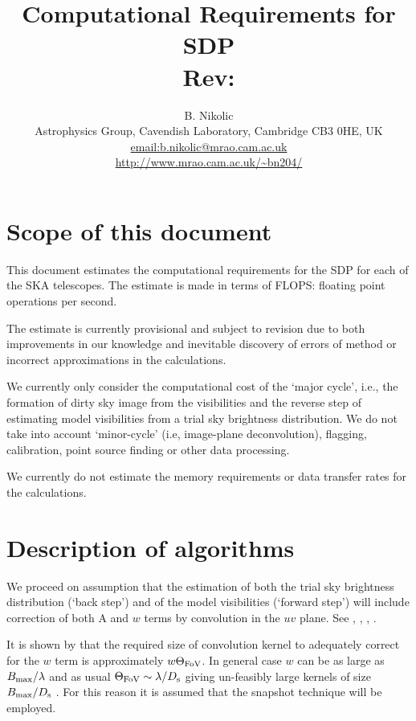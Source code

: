 \documentclass[useAMS,usenatbib,referee]{article}
\title{Computational Requirements for SDP\\
  Rev: }
\author{B. Nikolic\\
  Astrophysics Group, Cavendish Laboratory, Cambridge CB3 0HE, UK
  \\\url{email:b.nikolic@mrao.cam.ac.uk}
 \\\url{http://www.mrao.cam.ac.uk/~bn204/}}
\begin{document}
\maketitle

\tableofcontents

\section{Scope of this document}

This document estimates the computational requirements for the SDP for
each of the SKA telescopes. The estimate is made in terms of FLOPS:
floating point operations per second.

The estimate is currently provisional and subject to revision due to
both improvements in our knowledge and inevitable discovery of errors
of method or incorrect approximations in the calculations.

We currently only consider the computational cost of the `major
cycle', i.e., the formation of dirty sky image from the visibilities
and the reverse step of estimating model visibilities from a trial sky
brightness distribution. We do not take into account `minor-cycle'
(i.e, image-plane deconvolution), flagging, calibration, point source
finding or other data processing.

We currently do not estimate the memory requirements or data transfer
rates for the calculations.


\section{Description of algorithms}

We proceed on assumption that the estimation of both the trial sky
brightness distribution (`back step') and of the model visibilities
(`forward step') will include correction of both A and $w$ terms by
convolution in the $uv$ plane. See \cite{Cornwell2008-4703511},
\cite{Hymphreys132}, \cite{2012SPIE.8500E..0LC},
\cite{2008A&A...487..419B}.

It is shown by \cite{Hymphreys132} that the required size of
convolution kernel to adequately correct for the $w$ term is
approximately $w \Theta_{\rm FoV}$. In general case $w$ can be as
large as $B_{\rm max}/\lambda$ and as usual $\Theta_{\rm FoV} \sim
\lambda/ D_{\rm s}$ giving un-feasibly large kernels of size $B_{\rm
  max}/D_{\rm s}$ \citep[see discussion in][which is somewhat
difficult to follow but is along these lines]{Kogan2012-VLA164}. For
this reason it is assumed that the snapshot technique will be
employed.
\end{document}
